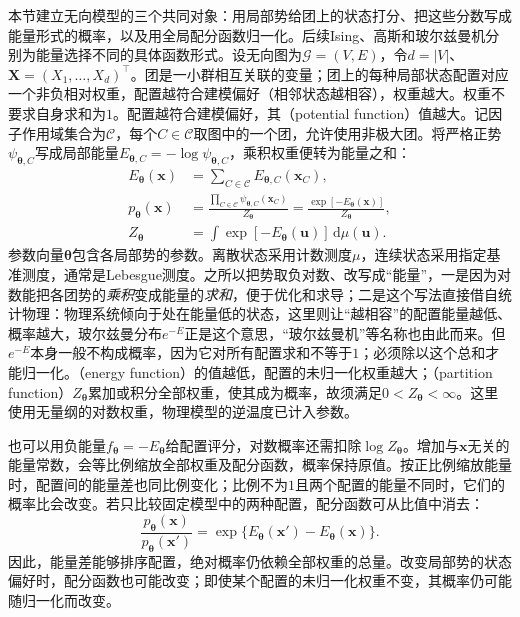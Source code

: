 本节建立无向模型的三个共同对象：用局部势给团上的状态打分、把这些分数写成能量形式的概率，以及用全局配分函数归一化。后续Ising、高斯和玻尔兹曼机分别为能量选择不同的具体函数形式。设无向图为$\mathcal{G}=(V,E)$，令$d=|V|$、$\bm{X}=(X_1,\ldots,X_d)^\top$。团是一小群相互关联的变量；团上的每种局部状态配置对应一个非负相对权重，配置越符合建模偏好（相邻状态越相容），权重越大。权重不要求自身求和为$1$。配置越符合建模偏好，其（potential function）值越大。记因子作用域集合为$\mathcal{C}$，每个$C\in\mathcal{C}$取图中的一个团，允许使用非极大团。将严格正势$\psi_{\bm{\theta},C}$写成局部能量$E_{\bm{\theta},C}=-\log\psi_{\bm{\theta},C}$，乘积权重便转为能量之和：
\begin{equation}
  \begin{aligned}
    E_{\bm{\theta}}(\bm{x})
      &=\sum_{C\in\mathcal{C}}E_{\bm{\theta},C}(\bm{x}_C),\\
    p_{\bm{\theta}}(\bm{x})
      &=\frac{\prod_{C\in\mathcal{C}}
               \psi_{\bm{\theta},C}(\bm{x}_C)}
              {Z_{\bm{\theta}}}
        =\frac{\exp[-E_{\bm{\theta}}(\bm{x})]}{Z_{\bm{\theta}}},\\
    Z_{\bm{\theta}}
      &=\int \exp[-E_{\bm{\theta}}(\bm{u})]\,\mathrm{d}\mu(\bm{u}).
  \end{aligned}
  \label{eq:pgm-energy-models-joint}
\end{equation}
参数向量$\bm{\theta}$包含各局部势的参数。离散状态采用计数测度$\mu$，连续状态采用指定基准测度，通常是Lebesgue测度。之所以把势取负对数、改写成“能量”，一是因为对数能把各团势的\emph{乘积}变成能量的\emph{求和}，便于优化和求导；二是这个写法直接借自统计物理：物理系统倾向于处在能量低的状态，这里则让“越相容”的配置能量越低、概率越大，玻尔兹曼分布$e^{-E}$正是这个意思，“玻尔兹曼机”等名称也由此而来。但$e^{-E}$本身一般不构成概率，因为它对所有配置求和不等于$1$；必须除以这个总和才能归一化。（energy function）的值越低，配置的未归一化权重越大；（partition function）$Z_{\bm{\theta}}$累加或积分全部权重，使其成为概率，故须满足$0<Z_{\bm{\theta}}<\infty$。这里使用无量纲的对数权重，物理模型的逆温度已计入参数。

也可以用负能量$f_{\bm{\theta}}=-E_{\bm{\theta}}$给配置评分，对数概率还需扣除$\log Z_{\bm{\theta}}$。增加与$\bm{x}$无关的能量常数，会等比例缩放全部权重及配分函数，概率保持原值。按正比例缩放能量时，配置间的能量差也同比例变化；比例不为$1$且两个配置的能量不同时，它们的概率比会改变。若只比较固定模型中的两种配置，配分函数可从比值中消去：
\[
  \frac{p_{\bm{\theta}}(\bm{x})}{p_{\bm{\theta}}(\bm{x}')}
  =\exp\{E_{\bm{\theta}}(\bm{x}')-E_{\bm{\theta}}(\bm{x})\}.
\]
因此，能量差能够排序配置，绝对概率仍依赖全部权重的总量。改变局部势的状态偏好时，配分函数也可能改变；即使某个配置的未归一化权重不变，其概率仍可能随归一化而改变。

